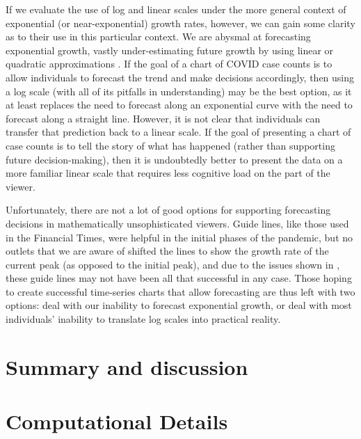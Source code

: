 \documentclass[article]{jdssv}\usepackage[]{graphicx}\usepackage[]{color}
\begin{document}
If we evaluate the use of log and linear scales under the more general context of exponential (or near-exponential) growth rates, however, we can gain some clarity as to their use in this particular context. We are abysmal at forecasting exponential growth, vastly under-estimating future growth by using linear or quadratic approximations \citep{wagenaarExtrapolationExponentialTime1978a,lawrenceExploringJudgementalForecasting1992,timmersInverseStatisticsMisperception1977a}. If the goal of a chart of COVID case counts is to allow individuals to forecast the trend and make decisions accordingly, then using a log scale (with all of its pitfalls in understanding) may be the best option, as it at least replaces the need to forecast along an exponential curve with the need to forecast along a straight line. However, it is not clear that individuals can transfer that prediction back to a linear scale. If the goal of presenting a chart of case counts is to tell the story of what has happened (rather than supporting future decision-making), then it is undoubtedly better to present the data on a more familiar linear scale that requires less cognitive load on the part of the viewer. 

Unfortunately, there are not a lot of good options for supporting forecasting decisions in mathematically unsophisticated viewers. Guide lines, like those used in the Financial Times, were helpful in the initial phases of the pandemic, but no outlets that we are aware of shifted the lines to show the growth rate of the current peak (as opposed to the initial peak), and due to the issues shown in , these guide lines may not have been all that successful in any case. Those hoping to create successful time-series charts that allow forecasting are thus left with two options: deal with our inability to forecast exponential growth, or deal with most individuals' inability to translate log scales into practical reality. 


\section{Summary and discussion} \label{sec:summary}


\newpage
\section*{Computational Details}
\end{document}
